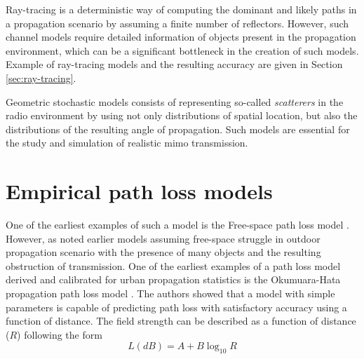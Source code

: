 Ray-tracing is a deterministic way of computing the dominant and likely paths in a propagation scenario by assuming a finite number of reflectors. However, such channel models require detailed information of objects present in the propagation environment, which can be a significant bottleneck in the creation of such models. Example of ray-tracing models and the resulting accuracy are given in Section \ref{sec:ray-tracing}.

Geometric stochastic models consists of representing so-called \emph{scatterers} in the radio environment by using not only distributions of spatial location, but also the distributions of the resulting angle of propagation. Such models are essential for the study and simulation of realistic \gls{mimo} transmission.  

\section{Empirical path loss models}\label{sec:empirical_path_loss}

One of the earliest examples of such a model is the Free-space path loss model \cite{Goldsmith2005WirelessCommunications}. However, as noted earlier models assuming free-space struggle in outdoor propagation scenario with the presence of many objects and the resulting obstruction of transmission. One of the earliest examples of a path loss model derived and calibrated for urban propagation statistics is the Okumuara-Hata propagation path loss model \cite{Hata1980}. The authors showed that a model with simple parameters is capable of predicting path loss with satisfactory accuracy using a function of distance. The field strength can be described as a function of distance ($R$) following the form
\begin{equation}
    L(dB) = A + B \log_{10} R
\end{equation}

